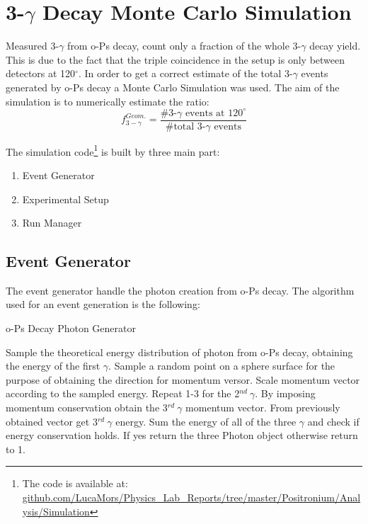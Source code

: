 \section*{3-$\gamma$ Decay Monte Carlo Simulation}

Measured 3-$\gamma$ from o-Ps decay, count only a fraction of the whole 3-$\gamma$ decay yield. This is due to the fact that the triple coincidence in the setup is only between detectors at 120$^\circ$. In order to get a correct estimate of the total 3-$\gamma$ events generated by o-Ps decay a Monte Carlo Simulation was used. The aim of the simulation is to numerically estimate the ratio:
\begin{equation*}
 f_{3-\gamma}^{Geom.} = \dfrac{\#\text{3-}\gamma\text{ events at 120}^\circ}{\#\text{total 3-}\gamma \text{ events}}
\end{equation*}

The simulation code\footnote{\noindent The code is available at:\\ \href{https://github.com/LucaMors/Physics_Lab_Reports/tree/master/Positronium/Analysis/Simulation}{github.com/LucaMors/Physics\_Lab\_Reports/tree/master/Positronium/Analysis/Simulation}} is built by three main part:
\begin{enumerate}
\item Event Generator
\item Experimental Setup
\item Run Manager
\end{enumerate}

\subsection*{Event Generator}

The event generator handle the photon creation from o-Ps decay. The algorithm used for an event generation is the following:
\begin{algorithm}
\caption{o-Ps Decay Photon Generator}\label{euclid}
\begin{algorithmic}[1]
\State Sample the theoretical energy distribution of photon from o-Ps decay, obtaining the energy of the first $\gamma$.
\State Sample a random point on a sphere surface for the purpose of obtaining the direction for momentum versor.
\State Scale momentum vector according to the sampled energy.
\State Repeat 1-3 for the 2$^{nd}\ \gamma$.
\State By imposing momentum conservation obtain the 3$^{rd}\ \gamma$ momentum vector.
\State From previously obtained vector get 3$^{rd}\ \gamma$ energy.
\State Sum the energy of all of the three $\gamma$ and check if energy conservation holds. If yes return the three Photon object otherwise return to 1.
\end{algorithmic}
\end{algorithm}

